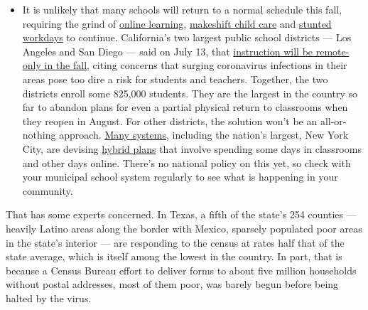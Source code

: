 \begin{itemize}
  \begin{itemize}
  \tightlist
  \item
    It is unlikely that many schools will return to a normal schedule
    this fall, requiring the grind of
    \href{https://www.nytimes3xbfgragh.onion/2020/06/05/us/coronavirus-education-lost-learning.html?action=click\&pgtype=Article\&state=default\&region=MAIN_CONTENT_3\&context=storylines_faq}{online
    learning},
    \href{https://www.nytimes3xbfgragh.onion/2020/05/29/us/coronavirus-child-care-centers.html?action=click\&pgtype=Article\&state=default\&region=MAIN_CONTENT_3\&context=storylines_faq}{makeshift
    child care} and
    \href{https://www.nytimes3xbfgragh.onion/2020/06/03/business/economy/coronavirus-working-women.html?action=click\&pgtype=Article\&state=default\&region=MAIN_CONTENT_3\&context=storylines_faq}{stunted
    workdays} to continue. California's two largest public school
    districts --- Los Angeles and San Diego --- said on July 13, that
    \href{https://www.nytimes3xbfgragh.onion/2020/07/13/us/lausd-san-diego-school-reopening.html?action=click\&pgtype=Article\&state=default\&region=MAIN_CONTENT_3\&context=storylines_faq}{instruction
    will be remote-only in the fall}, citing concerns that surging
    coronavirus infections in their areas pose too dire a risk for
    students and teachers. Together, the two districts enroll some
    825,000 students. They are the largest in the country so far to
    abandon plans for even a partial physical return to classrooms when
    they reopen in August. For other districts, the solution won't be an
    all-or-nothing approach.
    \href{https://bioethics.jhu.edu/research-and-outreach/projects/eschool-initiative/school-policy-tracker/}{Many
    systems}, including the nation's largest, New York City, are
    devising
    \href{https://www.nytimes3xbfgragh.onion/2020/06/26/us/coronavirus-schools-reopen-fall.html?action=click\&pgtype=Article\&state=default\&region=MAIN_CONTENT_3\&context=storylines_faq}{hybrid
    plans} that involve spending some days in classrooms and other days
    online. There's no national policy on this yet, so check with your
    municipal school system regularly to see what is happening in your
    community.
  \end{itemize}
\end{itemize}

That has some experts concerned. In Texas, a fifth of the state's 254
counties --- heavily Latino areas along the border with Mexico, sparsely
populated poor areas in the state's interior --- are responding to the
census at rates half that of the state average, which is itself among
the lowest in the country. In part, that is because a Census Bureau
effort to deliver forms to about five million households without postal
addresses, most of them poor, was barely begun before being halted by
the virus.

